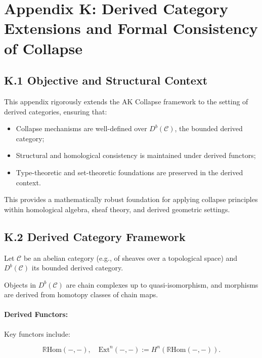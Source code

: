 \documentclass[11pt]{article}
\begin{document}
\section*{Appendix K: Derived Category Extensions and Formal Consistency of Collapse}

\subsection*{K.1 Objective and Structural Context}

This appendix rigorously extends the AK Collapse framework to the setting of derived categories, ensuring that:

\begin{itemize}
    \item Collapse mechanisms are well-defined over \( D^b(\mathcal{C}) \), the bounded derived category;
    \item Structural and homological consistency is maintained under derived functors;
    \item Type-theoretic and set-theoretic foundations are preserved in the derived context.
\end{itemize}

This provides a mathematically robust foundation for applying collapse principles within homological algebra, sheaf theory, and derived geometric settings.

\subsection*{K.2 Derived Category Framework}

Let \( \mathcal{C} \) be an abelian category (e.g., of sheaves over a topological space) and \( D^b(\mathcal{C}) \) its bounded derived category.

Objects in \( D^b(\mathcal{C}) \) are chain complexes up to quasi-isomorphism, and morphisms are derived from homotopy classes of chain maps.

\paragraph{Derived Functors:}
Key functors include:

\[
\mathbb{R}\mathrm{Hom}(-, -), \quad \mathrm{Ext}^n(-, -) := H^n(\mathbb{R}\mathrm{Hom}(-, -)).
\]
\end{document}
